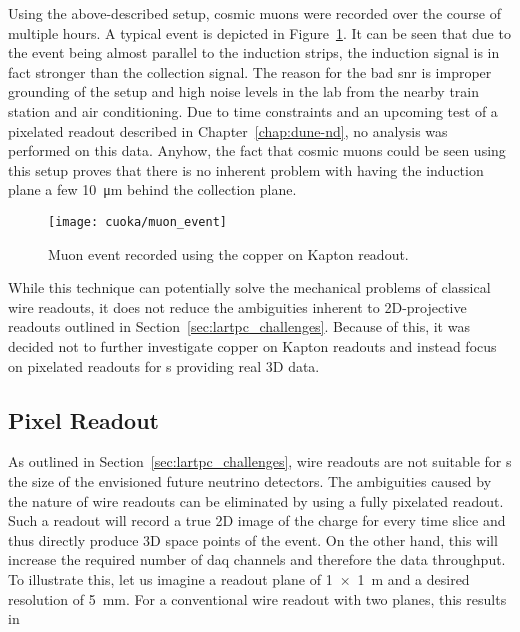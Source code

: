 Using the above-described setup, cosmic muons were recorded over the course of multiple hours.
A typical event is depicted in Figure~\ref{fig:cuoka_event}.
It can be seen that due to the event being almost parallel to the induction strips, the induction signal is in fact stronger than the collection signal.
The reason for the bad \gls{snr} is improper grounding of the setup and high noise levels in the lab from the nearby train station and air conditioning.
Due to time constraints and an upcoming test of a pixelated readout described in Chapter~\ref{chap:dune-nd}, no analysis was performed on this data.
Anyhow, the fact that cosmic muons could be seen using this setup proves that there is no inherent problem with having the induction plane a few \SI{10}{\micro\metre} behind the collection plane.

\begin{figure}[htb]
	\centering
	\texttt{[image: cuoka/muon\_event]}
	\caption{Muon event recorded using the copper on Kapton readout.}
	\label{fig:cuoka_event}
\end{figure}

While this technique can potentially solve the mechanical problems of classical wire readouts, it does not reduce the ambiguities inherent to 2D-projective readouts outlined in Section~\ref{sec:lartpc_challenges}.
Because of this, it was decided not to further investigate copper on Kapton readouts and instead focus on pixelated readouts for \lartpc{}s providing real 3D data.


\subsection{Pixel Readout}
\label{sec:studies_charge-ro_pixel}

As outlined in Section~\ref{sec:lartpc_challenges}, wire readouts are not suitable for \lartpc{}s the size of the envisioned future neutrino detectors.
The ambiguities caused by the nature of wire readouts can be eliminated by using a fully pixelated readout.
Such a readout will record a true 2D image of the charge for every time slice and thus directly produce 3D space points of the event.
On the other hand, this will increase the required number of \gls{daq} channels and therefore the data throughput.
To illustrate this, let us imagine a readout plane of \SI{1 x 1}{\metre} and a desired resolution of \SI{5}{\milli\metre}.
For a conventional wire readout with two planes, this results in


